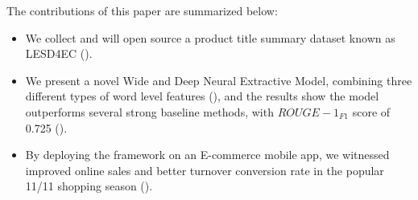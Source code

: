 The contributions of this paper are summarized below:
\begin{itemize}
	\itemsep0em
	\item We collect and will open source a product title summary dataset known as LESD4EC ().
	\item We present a novel Wide and Deep Neural Extractive Model, 
	combining three different types of word level features
	(), and the results 
	show the model outperforms 
	several strong baseline methods, with $ROUGE-1_{F1}$ score of 
	0.725 (). 
	\item By deploying the framework on an E-commerce mobile app, 
	we witnessed improved online sales 
	and better turnover conversion rate
	in the popular 11/11 shopping season ().
\end{itemize}
